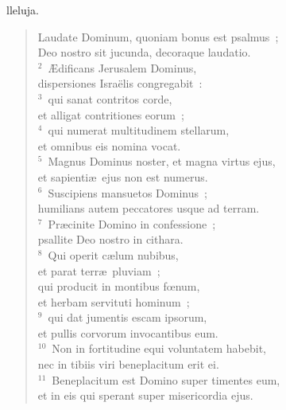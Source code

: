 \bchapter
{}lleluja. \begin{flushleft}\begin{verse}\vspace{6pt}Laudate Dominum, quoniam bonus est psalmus~;\\ Deo nostro sit jucunda, decoraque laudatio.\\
${}^{2}$~\AE dificans Jerusalem Dominus,\\ dispersiones Isra\"elis congregabit~:\\
${}^{3}$~qui sanat contritos corde,\\ et alligat contritiones eorum~;\\
${}^{4}$~qui numerat multitudinem stellarum,\\ et omnibus eis nomina vocat.\\
${}^{5}$~Magnus Dominus noster, et magna virtus ejus,\\ et sapienti\ae\ ejus non est numerus.\\
${}^{6}$~Suscipiens mansuetos Dominus~;\\ humilians autem peccatores usque ad terram.\\
${}^{7}$~Pr\ae cinite Domino in confessione~;\\ psallite Deo nostro in cithara.\\
${}^{8}$~Qui operit c\ae lum nubibus,\\ et parat terr\ae\ pluviam~;\\ qui producit in montibus fœnum,\\ et herbam servituti hominum~;\\
${}^{9}$~qui dat jumentis escam ipsorum,\\ et pullis corvorum invocantibus eum.\\
${}^{10}$~Non in fortitudine equi voluntatem habebit,\\ nec in tibiis viri beneplacitum erit ei.\\
${}^{11}$~Beneplacitum est Domino super timentes eum,\\ et in eis qui sperant super misericordia ejus.\end{verse}\end{flushleft}



